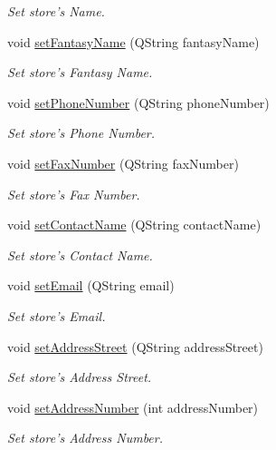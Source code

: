 \begin{DoxyCompactItemize}
\begin{DoxyCompactList}\small\item\em \-Set store's \-Name. \end{DoxyCompactList}\item 
void \hyperlink{class_store_aadf458ce76b589dee554d9a3d49e0d94}{set\-Fantasy\-Name} (\-Q\-String fantasy\-Name)
\begin{DoxyCompactList}\small\item\em \-Set store's \-Fantasy \-Name. \end{DoxyCompactList}\item 
void \hyperlink{class_store_af4164f59c5cb5a446020811c7004b97e}{set\-Phone\-Number} (\-Q\-String phone\-Number)
\begin{DoxyCompactList}\small\item\em \-Set store's \-Phone \-Number. \end{DoxyCompactList}\item 
void \hyperlink{class_store_a5dd2d8f31970d67f93fd3313ba46628b}{set\-Fax\-Number} (\-Q\-String fax\-Number)
\begin{DoxyCompactList}\small\item\em \-Set store's \-Fax \-Number. \end{DoxyCompactList}\item 
void \hyperlink{class_store_a1d6e3ec0d1df1cf79510476d7f25aea2}{set\-Contact\-Name} (\-Q\-String contact\-Name)
\begin{DoxyCompactList}\small\item\em \-Set store's \-Contact \-Name. \end{DoxyCompactList}\item 
void \hyperlink{class_store_a71f183b90f90b143611de7240eef403c}{set\-Email} (\-Q\-String email)
\begin{DoxyCompactList}\small\item\em \-Set store's \-Email. \end{DoxyCompactList}\item 
void \hyperlink{class_store_ae71d0dcc54f908bddaaa8094e2d062ae}{set\-Address\-Street} (\-Q\-String address\-Street)
\begin{DoxyCompactList}\small\item\em \-Set store's \-Address \-Street. \end{DoxyCompactList}\item 
void \hyperlink{class_store_ae826a6ca74a3eee3c79b9a6413300878}{set\-Address\-Number} (int address\-Number)
\begin{DoxyCompactList}\small\item\em \-Set store's \-Address \-Number. \end{DoxyCompactList}\item 

\end{DoxyCompactItemize}
